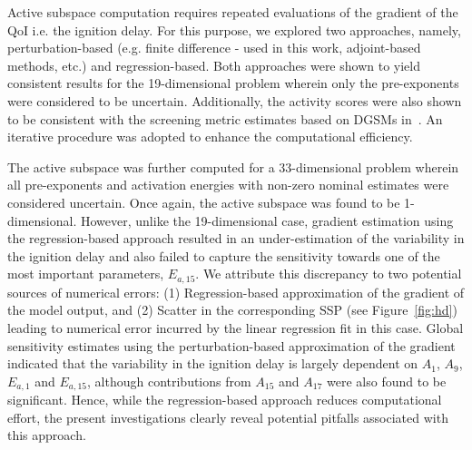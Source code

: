 Active subspace computation requires repeated evaluations of the gradient of
the QoI i.e. the ignition delay. For this purpose, we explored two approaches,
namely, perturbation-based (e.g. finite difference - used in this work, adjoint-based
methods, etc.) and regression-based. Both approaches were shown to yield consistent
results for the 19-dimensional
problem wherein only the pre-exponents were considered to be uncertain.
Additionally, the activity scores were also shown to be consistent with the
screening metric estimates based on DGSMs in~\cite{Vohra:2018}. An
iterative procedure was adopted to enhance the computational efficiency. 

The active subspace was further computed for a 33-dimensional problem
wherein all pre-exponents and activation energies with non-zero nominal
estimates were considered uncertain. Once again, the active subspace
was found to be 1-dimensional. However, unlike the 19-dimensional case,
gradient estimation using the regression-based approach resulted in an
under-estimation of the variability in the ignition delay and also failed
to capture the sensitivity towards one of the most important parameters, $E_{a,15}$.
We attribute
this discrepancy to two potential sources of numerical errors: (1)
Regression-based approximation of the gradient of the model output, and (2)
Scatter in the corresponding SSP (see Figure~\ref{fig:hd}) leading to numerical
error incurred by the linear regression fit in this case. 
Global sensitivity estimates using the perturbation-based
approximation of the gradient indicated that the variability in the ignition
delay is  largely dependent on $A_1$, $A_9$,
$E_{a,1}$ and $E_{a,15}$, although contributions from $A_{15}$ and $A_{17}$
were also found to be significant. 
Hence, while the
regression-based approach 
reduces computational effort, the present investigations clearly reveal
potential pitfalls associated with this approach. 


